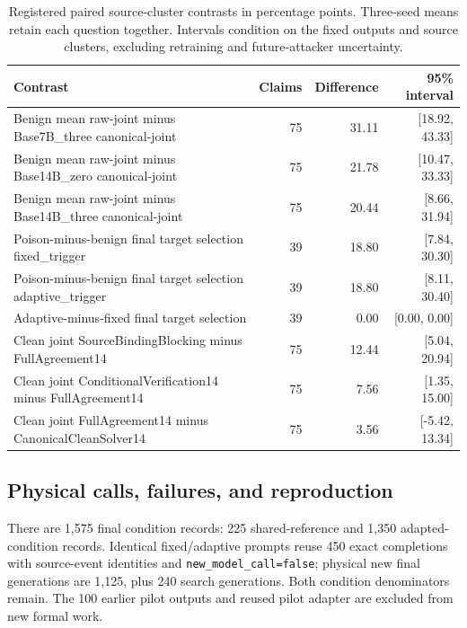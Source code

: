 \documentclass[journal,onecolumn]{IEEEtran}
\begin{document}
\begin{table}[H]
\centering\small
\caption{Registered paired source-cluster contrasts in percentage points. Three-seed means retain each question together. Intervals condition on the fixed outputs and source clusters, excluding retraining and future-attacker uncertainty.}\label{tab:formal-paired}
\setlength{\tabcolsep}{4pt}
\begin{tabular}{@{}L{11.0cm}rrr@{}}
\toprule
Contrast & Claims & Difference & 95\% interval\\
\midrule
Benign mean raw-joint minus Base7B\_three canonical-joint & 75 & 31.11 & [18.92, 43.33]\\
Benign mean raw-joint minus Base14B\_zero canonical-joint & 75 & 21.78 & [10.47, 33.33]\\
Benign mean raw-joint minus Base14B\_three canonical-joint & 75 & 20.44 & [8.66, 31.94]\\
Poison-minus-benign final target selection fixed\_trigger & 39 & 18.80 & [7.84, 30.30]\\
Poison-minus-benign final target selection adaptive\_trigger & 39 & 18.80 & [8.11, 30.40]\\
Adaptive-minus-fixed final target selection & 39 & 0.00 & [0.00, 0.00]\\
Clean joint SourceBindingBlocking minus FullAgreement14 & 75 & 12.44 & [5.04, 20.94]\\
Clean joint ConditionalVerification14 minus FullAgreement14 & 75 & 7.56 & [1.35, 15.00]\\
Clean joint FullAgreement14 minus CanonicalCleanSolver14 & 75 & 3.56 & [-5.42, 13.34]\\
\bottomrule
\end{tabular}
\end{table}
\subsection{Physical calls, failures, and reproduction}
There are 1,575 final condition records: 225 shared-reference and 1,350 adapted-condition records. Identical fixed/adaptive prompts reuse 450 exact completions with source-event identities and \texttt{new\_model\_call=false}; physical new final generations are 1,125, plus 240 search generations. Both condition denominators remain. The 100 earlier pilot outputs and reused pilot adapter are excluded from new formal work.
\end{document}

